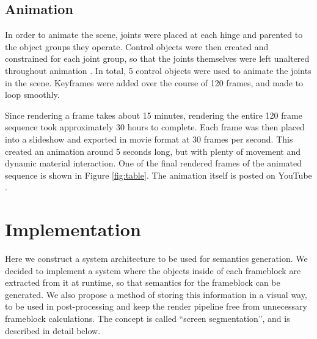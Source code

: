 \documentclass[conference]{IEEEtran}
\begin{document}
\subsection{Animation}
In order to animate the scene, joints were placed at each hinge and parented to the object groups they operate.
Control objects were then created and constrained for each joint group,
so that the joints themselves were left unaltered throughout animation \cite{rigging}.
In total, 5 control objects were used to animate the joints in the scene.
Keyframes were added over the course of 120 frames, and made to loop smoothly.

Since rendering a frame takes about 15 minutes,
rendering the entire 120 frame sequence took approximately 30 hours to complete.
Each frame was then placed into a slideshow and exported in movie format at 30 frames per second.
This created an animation around 5 seconds long,
but with plenty of movement and dynamic material interaction.
One of the final rendered frames of the animated sequence is shown in Figure \ref{fig:table}.
The animation itself is posted on YouTube \cite{animation}.

\section{Implementation}
Here we construct a system architecture to be used for semantics generation.
We decided to implement a system where the objects inside of each frameblock
are extracted from it at runtime, so that semantics for the frameblock
can be generated. We also propose a method of storing this information
in a visual way, to be used in post-processing and keep the render pipeline free from
unnecessary frameblock calculations.
The concept is called ``screen segmentation'', and is described
in detail below.
\end{document}
